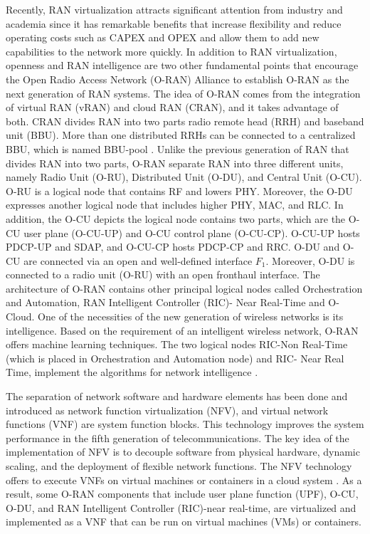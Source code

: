 \documentclass[conference]{IEEEtran}
\begin{document}
Recently, RAN virtualization attracts significant attention from industry and academia since it has remarkable benefits that increase flexibility and reduce operating costs such as CAPEX and OPEX and allow them to add new capabilities to the network more quickly. In addition to RAN virtualization, openness and RAN intelligence are two other fundamental points that encourage the Open Radio Access Network (O-RAN) Alliance to establish O-RAN as the next generation of RAN systems. 
The idea of O-RAN comes from the integration of virtual RAN (vRAN) and cloud RAN (CRAN), and it takes advantage of both. CRAN divides RAN into two parts radio remote head (RRH) and baseband unit (BBU).  More than one distributed RRHs can be connected to a centralized BBU, which is named BBU-pool \cite{han2019research}. 
Unlike the previous generation of RAN that divides RAN into two parts, O-RAN separate RAN into three different units, namely Radio Unit (O-RU), Distributed Unit (O-DU), and Central Unit (O-CU). 
O-RU is a logical node that contains RF and lowers PHY. Moreover, the O-DU expresses another logical node that includes higher PHY, MAC, and RLC.
 In addition, the O-CU depicts the logical node contains two parts, which are the O-CU user plane (O-CU-UP) and O-CU control plane (O-CU-CP). O-CU-UP hosts PDCP-UP and SDAP, and O-CU-CP hosts PDCP-CP and RRC.
O-DU and O-CU are connected via an open and well-defined interface $F_1$.
Moreover, O-DU is connected to a radio unit (O-RU) with an open fronthaul interface.
The architecture of O-RAN contains other principal logical nodes called Orchestration and Automation,
RAN Intelligent Controller (RIC)- Near Real-Time and O-Cloud. 
One of the necessities of the new generation of wireless networks is its intelligence.
Based on the requirement of an intelligent wireless network, O-RAN offers machine learning techniques. The two logical nodes RIC-Non Real-Time (which is placed in Orchestration and Automation node) and RIC- Near Real Time, implement the algorithms for network intelligence 
\cite{gavrilovska2020cloud,niknam2020intelligent,kazemifard2021minimum,both2021system,ORANArch,ORANML,lin2021toward}.

The separation of network software and hardware elements has been done and introduced as network function virtualization (NFV), and virtual network functions (VNF) are system function blocks. This technology improves the system performance in the fifth generation of telecommunications. 
The key idea of the implementation of NFV is to decouple software from physical hardware, dynamic scaling, and the deployment of flexible network functions. The NFV technology offers to execute VNFs on virtual machines or containers in a cloud system \cite{mijumbi2015network, luo2020online}.
As a result, some O-RAN components that include user plane function (UPF), O-CU, O-DU, and RAN Intelligent Controller (RIC)-near real-time, are virtualized and implemented as a VNF that can be run on virtual machines (VMs) or containers.
\end{document}
